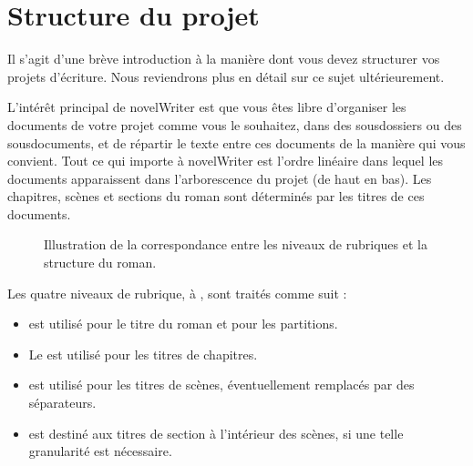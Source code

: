 \documentclass[a4paper,11pt,french]{sphinxmanual}
\begin{document}
\section{Structure du projet}
\label{\detokenize{usage_breakdown:project-layout}}\label{\detokenize{usage_breakdown:a-breakdown-project}}
\sphinxAtStartPar
Il s’agit d’une brève introduction à la manière dont vous devez structurer vos projets d’écriture. Nous reviendrons plus en détail sur ce sujet ultérieurement.

\sphinxAtStartPar
L’intérêt principal de novelWriter est que vous êtes libre d’organiser les documents de votre projet comme vous le souhaitez, dans des sous\sphinxhyphen{}dossiers ou des sous\sphinxhyphen{}documents, et de répartir le texte entre ces documents de la manière qui vous convient. Tout ce qui importe à novelWriter est l’ordre linéaire dans lequel les documents apparaissent dans l’arborescence du projet (de haut en bas). Les chapitres, scènes et sections du roman sont déterminés par les titres de ces documents.

\begin{figure}[htbp]
\centering
\capstart

\noindent{}
\caption{Illustration de la correspondance entre les niveaux de rubriques et la structure du roman.}\label{\detokenize{usage_breakdown:id4}}\end{figure}

\sphinxAtStartPar
Les quatre niveaux de rubrique,  à , sont traités comme suit :
\begin{itemize}
\item {} 
\sphinxAtStartPar
{} est utilisé pour le titre du roman et pour les partitions.

\item {} 
\sphinxAtStartPar
Le  est utilisé pour les titres de chapitres.

\item {} 
\sphinxAtStartPar
{} est utilisé pour les titres de scènes, éventuellement remplacés par des séparateurs.

\item {} 
\sphinxAtStartPar
{} est destiné aux titres de section à l’intérieur des scènes, si une telle granularité est nécessaire.

\end{itemize}
\end{document}
